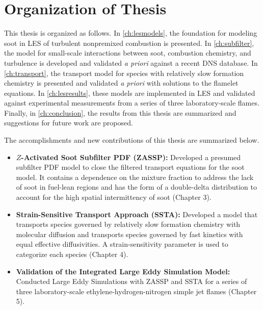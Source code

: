 \section{Organization of Thesis}
\label{sec:intro:org}

This thesis is organized as follows. In \cref{ch:lesmodels}, the foundation for modeling soot in LES of turbulent nonpremixed combustion is presented. In \cref{ch:subfilter}, the model for small-scale interactions between soot, combustion chemistry, and turbulence is developed and validated \textit{a priori} against a recent DNS database. In \cref{ch:transport}, the transport model for species with relatively slow formation chemistry is presented and validated \textit{a priori} with solutions to the flamelet equations. In \cref{ch:lesresults}, these models are implemented in LES and validated against experimental measurements from a series of three laboratory-scale flames. Finally, in \cref{ch:conclusion}, the results from this thesis are summarized and suggestions for future work are proposed.

The accomplishments and new contributions of this thesis are summarized below.
\begin{itemize}
\item \textbf{$Z$-Activated Soot Subfilter PDF (ZASSP):} Developed a presumed subfilter PDF model to close the filtered transport equations for the soot model. It contains a dependence on the mixture fraction to address the lack of soot in fuel-lean regions and has the form of a double-delta distribution to account for the high spatial intermittency of soot (Chapter 3).
\item \textbf{Strain-Sensitive Transport Approach (SSTA):} Developed a model that transports species governed by relatively slow formation chemistry with molecular diffusion and transports species governed by fast kinetics with equal effective diffusivities. A strain-sensitivity parameter is used to categorize each species (Chapter 4).
\item \textbf{Validation of the Integrated Large Eddy Simulation Model:} Conducted Large Eddy Simulations with ZASSP and SSTA for a series of three laboratory-scale ethylene-hydrogen-nitrogen simple jet flames (Chapter 5).
\end{itemize}
